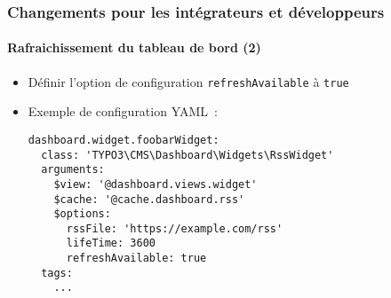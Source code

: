 %

\begin{frame}[fragile]
	\frametitle{Changements pour les intégrateurs et développeurs}
	\framesubtitle{Rafraichissement du tableau de bord (2)}


	\begin{itemize}
		\item Définir l'option de configuration \texttt{refreshAvailable} à \texttt{true}
		\item Exemple de configuration YAML~:
\begin{lstlisting}
dashboard.widget.foobarWidget:
  class: 'TYPO3\CMS\Dashboard\Widgets\RssWidget'
  arguments:
    $view: '@dashboard.views.widget'
    $cache: '@cache.dashboard.rss'
    $options:
      rssFile: 'https://example.com/rss'
      lifeTime: 3600
      refreshAvailable: true
  tags:
    ...
\end{lstlisting}

	\end{itemize}

\end{frame}

